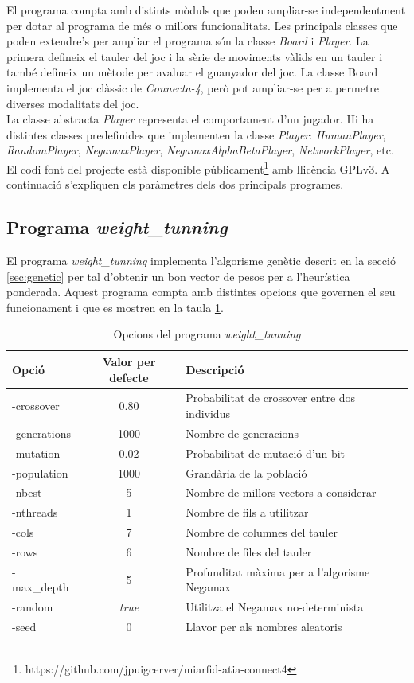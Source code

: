 \documentclass[12pt,a4paper]{article}
\begin{document}
El programa compta amb distints mòduls que poden ampliar-se independentment per dotar al programa de més o millors funcionalitats. Les principals classes que poden extendre's per ampliar el programa són la classe \emph{Board} i \emph{Player}. La primera defineix el tauler del joc i la sèrie de moviments vàlids en un tauler i també defineix un mètode per avaluar el guanyador del joc. La classe Board implementa el joc clàssic de \emph{Connecta-4}, però pot ampliar-se per a permetre diverses modalitats del joc.\\

La classe  abstracta \emph{Player} representa el comportament d'un jugador. Hi ha distintes classes predefinides que implementen la classe \emph{Player}: \emph{HumanPlayer}, \emph{RandomPlayer}, \emph{NegamaxPlayer}, \emph{NegamaxAlphaBetaPlayer}, \emph{NetworkPlayer}, etc.\\

El codi font del projecte està disponible públicament\footnote{https://github.com/jpuigcerver/miarfid-atia-connect4} amb llicència GPLv3. A continuació s'expliquen els paràmetres dels dos principals programes.\\

\subsection{Programa \emph{weight\_tunning}}
El programa \emph{weight\_tunning} implementa l'algorisme genètic descrit en la secció \ref{sec:genetic} per tal d'obtenir un bon vector de pesos per a l'heurística ponderada. Aquest programa compta amb distintes opcions que governen el seu funcionament i que es mostren en la taula \ref{tab:weight_tunning_opts}.\\

\begin{table}[h]
\centering
\begin{tabular}{|l|c|l|}
\hline 
Opció & Valor per defecte & Descripció\\
\hline 
-crossover & 0.80 & Probabilitat de crossover entre dos individus\\
-generations & 1000 & Nombre de generacions\\
-mutation & 0.02 & Probabilitat de mutació d'un bit\\
-population & 1000 & Grandària de la població\\
-nbest & 5 & Nombre de millors vectors a considerar\\
-nthreads & 1 & Nombre de fils a utilitzar \\
-cols & 7 & Nombre de columnes del tauler\\
-rows & 6 & Nombre de files del tauler\\
-max\_depth & 5 & Profunditat màxima per a l'algorisme Negamax\\
-random & \emph{true} & Utilitza el Negamax no-determinista\\
-seed & 0 & Llavor per als nombres aleatoris\\
\hline
\end{tabular}
\caption{Opcions del programa \emph{weight\_tunning}}
\label{tab:weight_tunning_opts}
\end{table}
\end{document}
